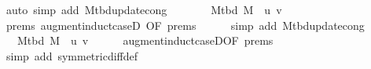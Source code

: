 \begin{isabellebody}
\ {\isacharparenleft}{\kern0pt}auto\ simp\ add{\isacharcolon}{\kern0pt}\ M{\isacharunderscore}{\kern0pt}tbd{\isacharunderscore}{\kern0pt}update{\isacharunderscore}{\kern0pt}cong{\isacharparenright}{\kern0pt}\isanewline
\ \ \isamarkupfalse%
\ \isamarkupfalse%
\ {\isachardoublequoteopen}{\isachardot}{\kern0pt}{\isachardot}{\kern0pt}{\isachardot}{\kern0pt}\ {\isacharequal}{\kern0pt}\ M{\isacharunderscore}{\kern0pt}tbd\ M\ {\isasymunion}\ {\isacharbraceleft}{\kern0pt}{\isacharbraceleft}{\kern0pt}u{\isacharcomma}{\kern0pt}\ v{\isacharbraceright}{\kern0pt}{\isacharbraceright}{\kern0pt}{\isachardoublequoteclose}\isanewline
\ \ \ \ \isamarkupfalse%
\ {\isachardoublequoteopen}{}{\isachardot}{\kern0pt}prems{\isachardoublequoteclose}{\isacharparenleft}{\kern0pt}{}{\isacharparenright}{\kern0pt}\ augment{\isacharunderscore}{\kern0pt}induct{\isacharunderscore}{\kern0pt}case{\isacharunderscore}{\kern0pt}{}D{\isacharparenleft}{\kern0pt}{}{\isacharcomma}{\kern0pt}\ {}{\isacharparenright}{\kern0pt}{\isacharbrackleft}{\kern0pt}OF\ {\isachardoublequoteopen}{}{\isachardot}{\kern0pt}prems{\isachardoublequoteclose}{\isacharbrackright}{\kern0pt}\isanewline
\ \ \ \ \isamarkupfalse%
\ {\isacharparenleft}{\kern0pt}simp\ add{\isacharcolon}{\kern0pt}\ M{\isacharunderscore}{\kern0pt}tbd{\isacharunderscore}{\kern0pt}update{\isacharunderscore}{\kern0pt}cong{\isacharparenright}{\kern0pt}\isanewline
\ \ \isamarkupfalse%
\ \isamarkupfalse%
\ {\isachardoublequoteopen}{\isachardot}{\kern0pt}{\isachardot}{\kern0pt}{\isachardot}{\kern0pt}\ {\isacharequal}{\kern0pt}\ M{\isacharunderscore}{\kern0pt}tbd\ M\ {\isasymoplus}\ {\isacharbraceleft}{\kern0pt}{\isacharbraceleft}{\kern0pt}u{\isacharcomma}{\kern0pt}\ v{\isacharbraceright}{\kern0pt}{\isacharbraceright}{\kern0pt}{\isachardoublequoteclose}\isanewline
\ \ \ \ \isamarkupfalse%
\ augment{\isacharunderscore}{\kern0pt}induct{\isacharunderscore}{\kern0pt}case{\isacharunderscore}{\kern0pt}{}D{\isacharparenleft}{\kern0pt}{}{\isacharparenright}{\kern0pt}{\isacharbrackleft}{\kern0pt}OF\ {\isachardoublequoteopen}{}{\isachardot}{\kern0pt}prems{\isachardoublequoteclose}{\isacharbrackright}{\kern0pt}\isanewline
\ \ \ \ \isamarkupfalse%
\ {\isacharparenleft}{\kern0pt}simp\ add{\isacharcolon}{\kern0pt}\ symmetric{\isacharunderscore}{\kern0pt}diff{\isacharunderscore}{\kern0pt}def{\isacharparenright}{\kern0pt}\isanewline

\end{isabellebody}
